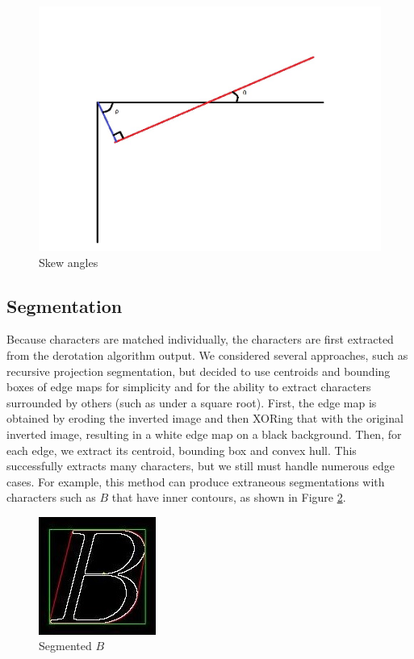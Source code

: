 \documentclass[journal]{IEEEtran}
\begin{document}
 
 
\begin{figure}[!t]
    \centering
    \includegraphics[width=\columnwidth]{fig3}
    \caption{Skew angles}
    \label{fig:3}
\end{figure}
 
\subsection{Segmentation}
Because characters are matched individually, the characters are first extracted from the derotation algorithm output. We considered several approaches, such as recursive projection segmentation\cite{Naqvi:article_typical}, but decided to use centroids and bounding boxes of edge maps for simplicity and for the ability to extract characters surrounded by others (such as under a square root).
First, the edge map is obtained by eroding the inverted image and then XORing that with the original inverted image, resulting in a white edge map on a black background. Then, for each edge, we extract its centroid, bounding box and convex hull. This successfully extracts many characters, but we still must handle numerous edge cases. For example, this method can produce extraneous segmentations with characters such as $B$ that have inner contours, as shown in Figure \ref{fig:B}.

\begin{figure}[!t]
    \centering
    \includegraphics{B}
    \caption{Segmented $B$}
    \label{fig:B}
\end{figure}
\end{document}
